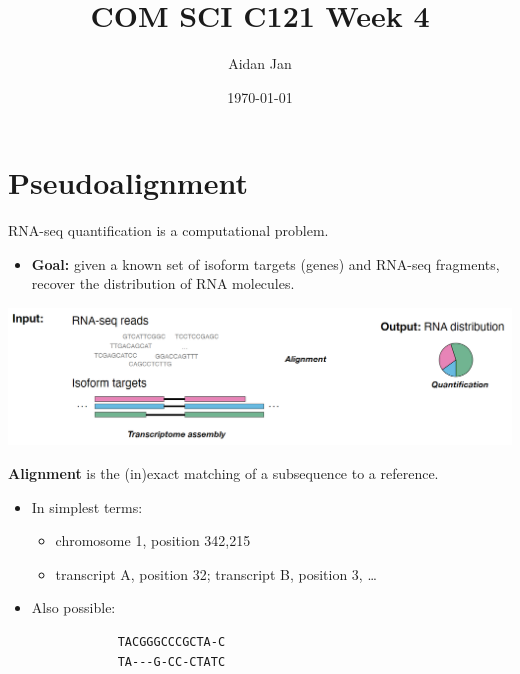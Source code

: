\documentclass[10pt]{article}
\title{COM SCI C121 Week 4}
\author{Aidan Jan}
\date{\today}
\begin{document}
\maketitle

\section*{Pseudoalignment}
RNA-seq quantification is a computational problem.
\begin{itemize}
    \item \textbf{Goal:} given a known set of isoform targets (genes) and RNA-seq fragments, recover the distribution of RNA molecules.
\end{itemize}
\begin{center}
    \includegraphics*[scale=0.5]{W4_1.png}
\end{center}
\textbf{Alignment} is the (in)exact matching of a subsequence to a reference.
\begin{itemize}
    \item In simplest terms:
    \begin{itemize}
        \item chromosome 1, position 342,215
        \item transcript A, position 32; transcript B, position 3, \dots
    \end{itemize}
    \item Also possible:
    \begin{verbatim}
            TACGGGCCCGCTA-C
            TA---G-CC-CTATC
    \end{verbatim}
\end{itemize}
\end{document}
